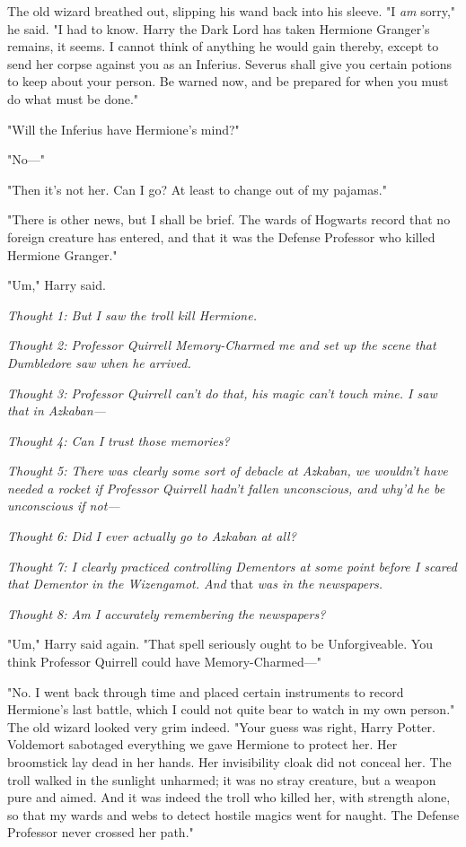 The old wizard breathed out, slipping his wand back into his sleeve. "I
\emph{am} sorry," he said. "I had to know. Harry{\el} the Dark Lord has
taken Hermione Granger's remains, it seems. I cannot think of anything he would
gain thereby, except to send her corpse against you as an Inferius. Severus
shall give you certain potions to keep about your person. Be warned now, and be
prepared for when you must do what must be done."

"Will the Inferius have Hermione's mind?"

"No---"

"Then it's not her. Can I go? At least to change out of my pajamas."

"There is other news, but I shall be brief. The wards of Hogwarts record that
no foreign creature has entered, and that it was the Defense Professor who
killed Hermione Granger."

"Um," Harry said.

\emph{Thought 1: But I saw the troll kill Hermione.}

\emph{Thought 2: Professor Quirrell Memory-Charmed me and set up the scene that
Dumbledore saw when he arrived.}

\emph{Thought 3: Professor Quirrell can't do that, his magic can't touch mine.
I saw that in Azkaban---}

\emph{Thought 4: Can I trust those memories?}

\emph{Thought 5: There was clearly some sort of debacle at Azkaban, we wouldn't
have needed a rocket if Professor Quirrell hadn't fallen unconscious, and why'd
he be unconscious if not---}

\emph{Thought 6: Did I ever actually go to Azkaban at all?}

\emph{Thought 7: I clearly practiced controlling Dementors at some point before
I scared that Dementor in the Wizengamot. And} that \emph{was in the
newspapers.}

\emph{Thought 8: Am I accurately remembering the newspapers?}

"Um," Harry said again. "That spell seriously ought to be Unforgiveable. You
think Professor Quirrell could have Memory-Charmed---"

"No. I went back through time and placed certain instruments to record
Hermione's last battle, which I could not quite bear to watch in my own
person." The old wizard looked very grim indeed. "Your guess was right, Harry
Potter. Voldemort sabotaged everything we gave Hermione to protect her. Her
broomstick lay dead in her hands. Her invisibility cloak did not conceal her.
The troll walked in the sunlight unharmed; it was no stray creature, but a
weapon pure and aimed. And it was indeed the troll who killed her, with
strength alone, so that my wards and webs to detect hostile magics went for
naught. The Defense Professor never crossed her path."

